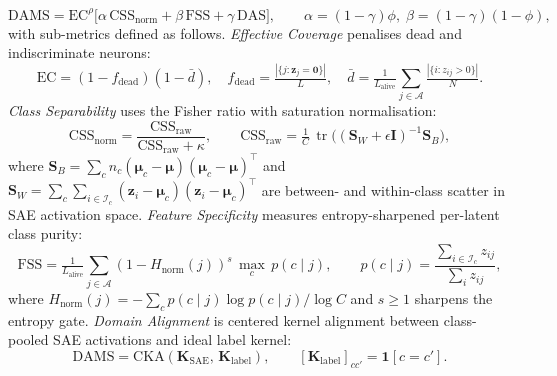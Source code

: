 \begin{equation}
\label{eq:dams}
\mathrm{DAMS}
=
\mathrm{EC}^{\rho}
\bigl[
\alpha\,\mathrm{CSS}_{\mathrm{norm}}
+ \beta\,\mathrm{FSS}
+ \gamma\,\mathrm{DAS}
\bigr],
\qquad
\alpha{=}(1{-}\gamma)\phi,\;
\beta{=}(1{-}\gamma)(1{-}\phi),
\end{equation}
with sub-metrics defined as follows.
\emph{Effective Coverage} penalises dead and indiscriminate neurons:
\begin{equation}
\label{eq:ec}
\mathrm{EC}
= (1 - f_{\mathrm{dead}})(1 - \bar{d}),
\quad
f_{\mathrm{dead}}
= \tfrac{|\{j:\mathbf{z}_j=\mathbf{0}\}|}{L},
\quad
\bar{d}
= \tfrac{1}{L_{\mathrm{alive}}}
  {\textstyle\sum_{j\in\mathcal{A}}}
  \tfrac{|\{i:z_{ij}>0\}|}{N}.
\end{equation}
\emph{Class Separability} uses the Fisher ratio with saturation normalisation:
\begin{equation}
\label{eq:css}
\mathrm{CSS}_{\mathrm{norm}}
= \frac{\mathrm{CSS}_{\mathrm{raw}}}{\mathrm{CSS}_{\mathrm{raw}}+\kappa},
\qquad
\mathrm{CSS}_{\mathrm{raw}}
= \tfrac{1}{C}\,\operatorname{tr}\!\bigl(
  (\mathbf{S}_W{+}\epsilon\mathbf{I})^{-1}\mathbf{S}_B
\bigr),
\end{equation}
where $\mathbf{S}_B=\sum_c n_c(\boldsymbol{\mu}_c{-}\boldsymbol{\mu})(\boldsymbol{\mu}_c{-}\boldsymbol{\mu})^\top$ and $\mathbf{S}_W=\sum_c\sum_{i\in\mathcal{I}_c}(\mathbf{z}_i{-}\boldsymbol{\mu}_c)(\mathbf{z}_i{-}\boldsymbol{\mu}_c)^\top$ are between- and within-class scatter in SAE activation space.
\emph{Feature Specificity} measures entropy-sharpened per-latent class purity:\vspace{-1mm}
\begin{equation}
\label{eq:fss}
\mathrm{FSS}
= \tfrac{1}{L_{\mathrm{alive}}}
  {\textstyle\sum_{j\in\mathcal{A}}}
  (1{-}H_{\mathrm{norm}}(j))^{s}\,\max_c\,p(c\!\mid\!j),
\qquad
p(c\!\mid\!j)
= \frac{\sum_{i\in\mathcal{I}_c}z_{ij}}{\sum_i z_{ij}},
\end{equation}
where $H_{\mathrm{norm}}(j)=-\sum_c p(c\!\mid\!j)\log p(c\!\mid\!j)/\log C$ and $s\ge 1$ sharpens the entropy gate.
\emph{Domain Alignment} is centered kernel alignment between class-pooled SAE activations and ideal label kernel:
\begin{equation}
\label{eq:das}
\mathrm{DAMS}
= \mathrm{CKA}(\mathbf{K}_{\mathrm{SAE}},\,\mathbf{K}_{\mathrm{label}}),
\qquad
[\mathbf{K}_{\mathrm{label}}]_{cc'}=\mathbf{1}[c{=}c'].
\end{equation}

